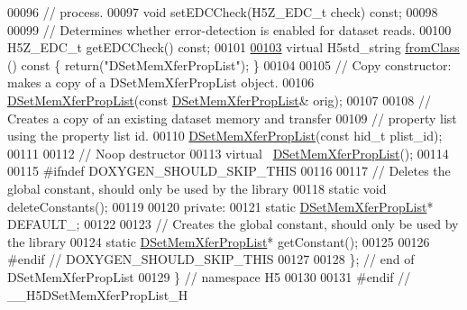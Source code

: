 \begin{DoxyCode}
00096         \textcolor{comment}{// process.}
00097         \textcolor{keywordtype}{void} setEDCCheck(H5Z\_EDC\_t check) \textcolor{keyword}{const};
00098 
00099         \textcolor{comment}{// Determines whether error-detection is enabled for dataset reads.}
00100         H5Z\_EDC\_t getEDCCheck() \textcolor{keyword}{const};
00101 
\hyperlink{class_h5_1_1_d_set_mem_xfer_prop_list_ad08ac681bb8862694b6387b40d4083e9}{00103}         \textcolor{keyword}{virtual} H5std\_string \hyperlink{class_h5_1_1_d_set_mem_xfer_prop_list_ad08ac681bb8862694b6387b40d4083e9}{fromClass} ()\textcolor{keyword}{ const }\{ \textcolor{keywordflow}{return}(\textcolor{stringliteral}{"DSetMemXferPropList"}); \}
00104 
00105         \textcolor{comment}{// Copy constructor: makes a copy of a DSetMemXferPropList object.}
00106         \hyperlink{class_h5_1_1_d_set_mem_xfer_prop_list}{DSetMemXferPropList}(\textcolor{keyword}{const} \hyperlink{class_h5_1_1_d_set_mem_xfer_prop_list}{DSetMemXferPropList}& orig);
00107 
00108         \textcolor{comment}{// Creates a copy of an existing dataset memory and transfer}
00109         \textcolor{comment}{// property list using the property list id.}
00110         \hyperlink{class_h5_1_1_d_set_mem_xfer_prop_list}{DSetMemXferPropList}(\textcolor{keyword}{const} hid\_t plist\_id);
00111 
00112         \textcolor{comment}{// Noop destructor}
00113         \textcolor{keyword}{virtual} ~\hyperlink{class_h5_1_1_d_set_mem_xfer_prop_list}{DSetMemXferPropList}();
00114 
00115 \textcolor{preprocessor}{#ifndef DOXYGEN\_SHOULD\_SKIP\_THIS}
00116 
00117         \textcolor{comment}{// Deletes the global constant, should only be used by the library}
00118         \textcolor{keyword}{static} \textcolor{keywordtype}{void} deleteConstants();
00119 
00120     \textcolor{keyword}{private}:
00121         \textcolor{keyword}{static} \hyperlink{class_h5_1_1_d_set_mem_xfer_prop_list}{DSetMemXferPropList}* DEFAULT\_;
00122 
00123         \textcolor{comment}{// Creates the global constant, should only be used by the library}
00124         \textcolor{keyword}{static} \hyperlink{class_h5_1_1_d_set_mem_xfer_prop_list}{DSetMemXferPropList}* getConstant();
00125 
00126 \textcolor{preprocessor}{#endif // DOXYGEN\_SHOULD\_SKIP\_THIS}
00127 
00128 \}; \textcolor{comment}{// end of DSetMemXferPropList}
00129 \} \textcolor{comment}{// namespace H5}
00130 
00131 \textcolor{preprocessor}{#endif // \_\_H5DSetMemXferPropList\_H}
\end{DoxyCode}
